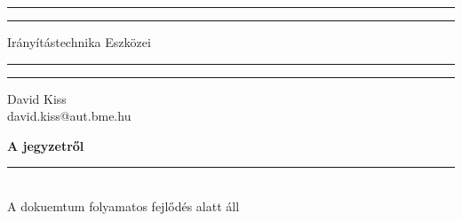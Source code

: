 \documentclass[12pt,hidelinks]{article}
\begin{document}
\begin{titlepage}
	\centering %
	\scshape %
	\vspace*{1.5\baselineskip} %

	\rule{13cm}{1.6pt}\vspace*{-\baselineskip}\vspace*{2pt} %
	\rule{13cm}{0.4pt} %
	
		\vspace{0.75\baselineskip} %
	{	\Huge Irányítástechnika Eszközei\\	}
		\vspace{0.75\baselineskip} %
	\rule{13cm}{0.4pt}\vspace*{-\baselineskip}\vspace{3.2pt} %
	\rule{13cm}{1.6pt} %
	
		\vspace{1.75\baselineskip} %
	{\large David Kiss \\
		\vspace*{1.2\baselineskip}
	david.kiss@aut.bme.hu} \\
	\vfill

\end{titlepage}
\tableofcontents
\vfill
\small{\noindent \textbf{A jegyzetről} \vspace{-3mm}\\
\noindent \rule{3.3cm}{0.5pt} \\
A dokuemtum folyamatos fejlődés alatt áll}
\newpage








%
\end{document}
